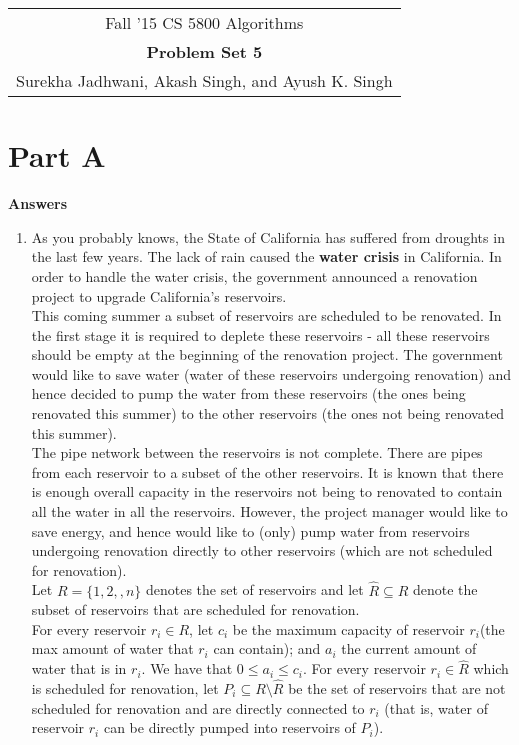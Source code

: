 \documentclass[12pt]{article}
\begin{document}
\begin{center}
\begin{tabular}{|c|}
\hline
\hspace{5cm} Fall '15 CS 5800 Algorithms \\
{\bfseries \large Problem Set 5}\\
Surekha Jadhwani, Akash Singh, and Ayush K. Singh\\
\hline
\end{tabular}
\end{center}

\section{Part A}
\textbf{\large{Answers}}
\begin{enumerate}
\item  As you probably knows, the State of California has suffered from droughts in the last few years. The lack of rain caused the \textbf{water crisis} in California. In order to handle the water crisis, the government announced a renovation project to upgrade California’s reservoirs.\\
This coming summer a subset of reservoirs are scheduled to be renovated. In the first stage it is required to deplete these reservoirs - all these reservoirs should be empty at the beginning of the renovation project. The government would like to save water (water of these reservoirs undergoing renovation) and hence decided to pump the water from these reservoirs (the ones being renovated this summer) to the other reservoirs (the ones not being renovated this summer).\\
The pipe network between the reservoirs is not complete. There are pipes from each reservoir to a subset of the other reservoirs. It is known that there is enough overall capacity in the reservoirs not being to renovated to contain all the water in all the reservoirs. However, the project manager would like to save energy, and hence would like to (only) pump water from reservoirs undergoing renovation directly to other reservoirs (which are not scheduled for renovation).\\
Let $R = \{1, 2, , n\}$ denotes the set of reservoirs and let $\widehat{R} \subseteq R$ denote the subset of reservoirs that are scheduled for renovation.\\
For every reservoir $r_i \in R$, let $c_i$ be the maximum capacity of reservoir $r_i$(the max amount of water that $r_i$ can contain); and $a_i$ the current amount of water that is in $r_i$. We have that $0 \leq a_i \leq c_i$. For every reservoir $r_i \in \widehat{R}$ which is scheduled for renovation, let $P_i \subseteq R \setminus \widehat{R}$ be the set of reservoirs that are not scheduled for renovation and are directly connected to $r_i$ (that is, water of reservoir $r_i$ can be directly pumped into reservoirs of $P_i$).

\end{enumerate}
\end{document}

